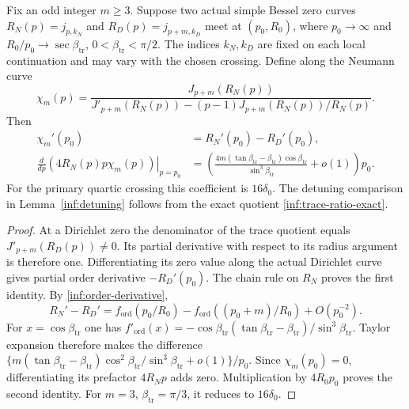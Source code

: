 \begin{remark}
\label{inf:trace-curve-derivative}
Fix an odd integer $m\ge3$. Suppose two actual simple Bessel zero
curves $R_N(p)=j_{p,k_N}$ and $R_D(p)=j_{p+m,k_D}$ meet at
$(p_0,R_0)$, where $p_0\to\infty$ and
$R_0/p_0\to\sec\beta_{\mathrm{tr}}$,
$0<\beta_{\mathrm{tr}}<\pi/2$. The indices $k_N,k_D$ are fixed on each local
continuation and may vary with the chosen crossing.
Define along the Neumann curve
\[
 \chi_m(p)=\frac{J_{p+m}(R_N(p))}
 {J'_{p+m}(R_N(p))-(p-1)J_{p+m}(R_N(p))/R_N(p)}.
\]
Then
\begin{equation}\label{inf:true-zero-derivative}
 \begin{aligned}
 \chi_m'(p_0)&=R_N'(p_0)-R_D'(p_0),\\
 \left.\frac d{dp}(4R_N(p)p\chi_m(p))\right|_{p=p_0}
 &=\left(\frac{4m(\tan\beta_{\mathrm{tr}}-\beta_{\mathrm{tr}})
                    \cos\beta_{\mathrm{tr}}}{\sin^3\beta_{\mathrm{tr}}}
        +o(1)\right)p_0.
 \end{aligned}
\end{equation}
For the primary quartic crossing this coefficient is $16\delta_0$.
The detuning comparison in Lemma~\ref{inf:detuning} follows
from the exact quotient \eqref{inf:trace-ratio-exact}.
\end{remark}
\begin{proof}
At a Dirichlet zero the denominator of the trace quotient equals
$J'_{p+m}(R_D(p))\ne0$. Its partial derivative with respect to
its radius argument is therefore one. Differentiating its zero
value along the actual Dirichlet curve gives partial order
derivative $-R_D'(p_0)$. The chain rule on $R_N$ proves the first
identity.
By \eqref{inf:order-derivative},
\[
 R_N'-R_D'
 =f_{\mathrm{ord}}(p_0/R_0)
       -f_{\mathrm{ord}}((p_0+m)/R_0)+O(p_0^{-2}).
\]
For $x=\cos\beta_{\mathrm{tr}}$ one has
$f'_{\mathrm{ord}}(x)=-\cos\beta_{\mathrm{tr}}
(\tan\beta_{\mathrm{tr}}-\beta_{\mathrm{tr}})/\sin^3\beta_{\mathrm{tr}}$.
Taylor expansion therefore makes the difference
$\{m(\tan\beta_{\mathrm{tr}}-\beta_{\mathrm{tr}})
\cos^2\beta_{\mathrm{tr}}/\sin^3\beta_{\mathrm{tr}}+o(1)\}/p_0$.
Since $\chi_m(p_0)=0$, differentiating its prefactor $4R_Np$
adds zero. Multiplication by $4R_0p_0$ proves the second identity.
For $m=3$, $\beta_{\mathrm{tr}}=\pi/3$, it reduces to $16\delta_0$.
\end{proof}

